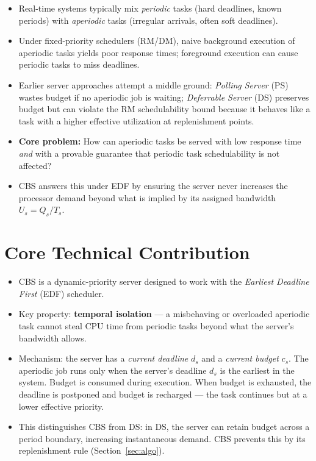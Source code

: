 \documentclass[conference]{IEEEtran}
\begin{document}
\begin{itemize}
  \item Real-time systems typically mix \emph{periodic} tasks (hard deadlines,
        known periods) with \emph{aperiodic} tasks (irregular arrivals, often
        soft deadlines).
  \item Under fixed-priority schedulers (RM/DM), naive background execution of
        aperiodic tasks yields poor response times; foreground execution
        can cause periodic tasks to miss deadlines.
  \item Earlier server approaches attempt a middle ground:
        \emph{Polling Server} (PS) wastes budget if no aperiodic job is
        waiting; \emph{Deferrable Server} (DS) preserves budget but can
        violate the RM schedulability bound because it behaves like a task with
        a higher effective utilization at replenishment points.
  \item \textbf{Core problem:} How can aperiodic tasks be served with low
        response time \emph{and} with a provable guarantee that periodic task
        schedulability is not affected?
  \item CBS answers this under EDF by ensuring the server never increases the
        processor demand beyond what is implied by its assigned bandwidth
        $U_s = Q_s / T_s$.
\end{itemize}

\section{Core Technical Contribution}

\begin{itemize}
  \item CBS is a dynamic-priority server designed to work with the
        \emph{Earliest Deadline First} (EDF) scheduler.
  \item Key property: \textbf{temporal isolation} --- a misbehaving or
        overloaded aperiodic task cannot steal CPU time from periodic tasks
        beyond what the server's bandwidth allows.
  \item Mechanism: the server has a \emph{current deadline} $d_s$ and a
        \emph{current budget} $c_s$. The aperiodic job runs only when the
        server's deadline $d_s$ is the earliest in the system. Budget is
        consumed during execution. When budget is exhausted, the deadline is
        postponed and budget is recharged --- the task continues but at a
        lower effective priority.
  \item This distinguishes CBS from DS: in DS, the server can retain budget
        across a period boundary, increasing instantaneous demand. CBS
        prevents this by its replenishment rule (Section~\ref{sec:algo}).
\end{itemize}
\end{document}

